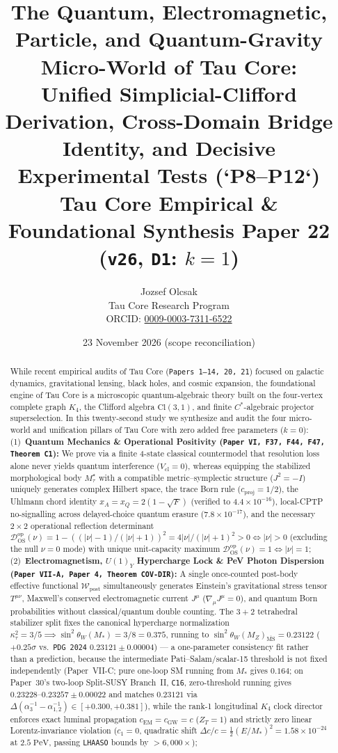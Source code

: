 \documentclass[11pt,a4paper]{article}
\title{\textbf{The Quantum, Electromagnetic, Particle, and Quantum-Gravity Micro-World of Tau Core:\\
Unified Simplicial-Clifford Derivation, Cross-Domain Bridge Identity, and Decisive Experimental Tests (`P8--P12`)}\\
\large Tau Core Empirical \& Foundational Synthesis Paper 22 (\texttt{v26}, \texttt{D1}: $k=1$)}
\author{Jozsef Olcsak\\
\small Tau Core Research Program\\{\small ORCID: \href{https://orcid.org/0009-0003-7311-6522}{0009-0003-7311-6522}}}
\date{23 November 2026 (scope reconciliation)}
\begin{document}
\maketitle

\begin{abstract}
While recent empirical audits of Tau Core (\texttt{Papers 1--14, 20, 21}) focused on galactic dynamics, gravitational lensing, black holes, and cosmic expansion, the foundational engine of Tau Core is a microscopic quantum-algebraic theory built on the four-vertex complete graph $K_4$, the Clifford algebra $\mathrm{Cl}(3,1)$, and finite $C^*$-algebraic projector superselection. In this twenty-second study we synthesize and audit the four micro-world and unification pillars of Tau Core with zero added free parameters ($k=0$):
(1)~\textbf{Quantum Mechanics \& Operational Positivity (\texttt{Paper VI, F37, F44, F47, Theorem C1}):} We prove via a finite 4-state classical countermodel that resolution loss alone never yields quantum interference ($V_{\mathrm{cl}}=0$), whereas equipping the stabilized morphological body $M_\tau^\star$ with a compatible metric--symplectic structure ($J^2=-I$) uniquely generates complex Hilbert space, the trace Born rule ($c_{\mathrm{proj}}=1/2$), the Uhlmann chord identity $x_A=x_Q=2(1-\sqrt{F})$ (verified to $4.4\times 10^{-16}$), local-CPTP no-signalling across delayed-choice quantum erasure ($7.8\times 10^{-17}$), and the necessary $2\times 2$ operational reflection determinant $\mathcal{D}_{\mathrm{OS}}^{\mathrm{op}}(\nu)=1-((|\nu|-1)/(|\nu|+1))^2=4|\nu|/(|\nu|+1)^2>0\iff|\nu|>0$ (excluding the null $\nu=0$ mode) with unique unit-capacity maximum $\mathcal{D}_{\mathrm{OS}}^{\mathrm{op}}(\nu)=1\iff|\nu|=1$;
(2)~\textbf{Electromagnetism, $U(1)_Y$ Hypercharge Lock \& PeV Photon Dispersion (\texttt{Paper VII-A, Paper 4, Theorem COV-DIR}):} A single once-counted post-body effective functional $\mathcal{W}_{\mathrm{post}}$ simultaneously generates Einstein's gravitational stress tensor $T^{\mu\nu}$, Maxwell's conserved electromagnetic current $J^\mu$ ($\nabla_\mu J^\mu=0$), and quantum Born probabilities without classical/quantum double counting. The $3+2$ tetrahedral stabilizer split fixes the canonical hypercharge normalization $\kappa_\tau^2=3/5\implies\sin^2\theta_W(M_*)=3/8=0.375$, running to $\sin^2\theta_W(M_Z)_{\overline{\mathrm{MS}}}=0.23122$ ($+0.25\sigma$ vs.\ \texttt{PDG 2024} $0.23121\pm0.00004$) --- a one-parameter consistency fit rather than a prediction, because the intermediate Pati--Salam/\allowbreak scalar-15 threshold is not fixed independently (Paper~VII-C; pure one-loop SM running from $M_*$ gives $0.164$; on Paper~30's two-loop Split-SUSY Branch~II, \texttt{C16}, zero-threshold running gives $0.23228\text{--}0.23257\pm 0.00022$ and matches $0.23121$ via $\Delta(\alpha_3^{-1}-\alpha_{1,2}^{-1})\in[+0.300,+0.381]$), while the rank-1 longitudinal $K_4$ clock director enforces exact luminal propagation $c_{\mathrm{EM}}=c_{\mathrm{GW}}=c$ ($Z_T=1$) and strictly zero linear Lorentz-invariance violation ($c_1=0$, quadratic shift $\Delta c/c=\frac{1}{2}(E/M_*)^2=1.58\times 10^{-24}$ at $2.5\;\mathrm{PeV}$, passing \texttt{LHAASO} bounds by $>6{,}000\times$);

\end{abstract}
\end{document}
